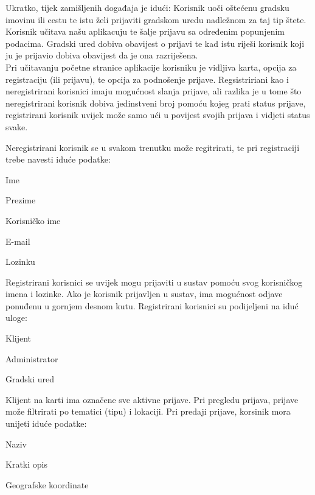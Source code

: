		 Ukratko, tijek zamišljenih događaja je idući: Korisnik uoči oštećenu gradsku imovinu ili cestu te istu želi prijaviti gradskom uredu nadležnom za taj tip štete. Korisnik učitava našu aplikacuju te šalje prijavu sa određenim popunjenim podacima. Gradski ured dobiva obavijest o prijavi te kad istu riješi korisnik koji ju je prijavio dobiva obavijest da je ona razriješena. \\
		
		 Pri učitavanju početne stranice aplikacije korisniku je vidljiva karta, opcija za registraciju (ili prijavu), te opcija za podnošenje prijave. Regsistririani kao i neregistrirani korisnici imaju mogućnost slanja prijave, ali razlika je u tome što neregistrirani korisnik dobiva jedinstveni broj pomoću kojeg prati status prijave, registrirani korisnik uvijek može samo ući u povijest svojih prijava i vidjeti status svake.
		
		 Neregistrirani korisnik se u svakom trenutku može regitrirati, te pri registraciji trebe navesti iduće podatke:
		
		\begin{packed_item}
		\item Ime
		\item Prezime
		\item Korisničko ime
		\item E-mail
		\item Lozinku\\
		\end{packed_item}
		
		 Registrirani korisnici se uvijek mogu prijaviti u sustav pomoću svog korisničkog imena i lozinke. Ako je korisnik prijavljen u sustav, ima mogućnost odjave ponuđenu u gornjem desnom kutu.
		\noindent Registrirani korisnici su podijeljeni na iduć uloge:
			\begin{packed_item}
			\item Klijent
			\item Administrator
			\item Gradski ured\\
			\end{packed_item}
			
			Klijent na karti ima označene sve aktivne prijave. Pri pregledu prijava, prijave može filtrirati po tematici (tipu) i lokaciji. Pri predaji prijave, korsinik mora unijeti iduće podatke:
			\begin{packed_item}
			\item Naziv
			\item Kratki opis
			\item Geografske koordinate
			\end{packed_item}
			
